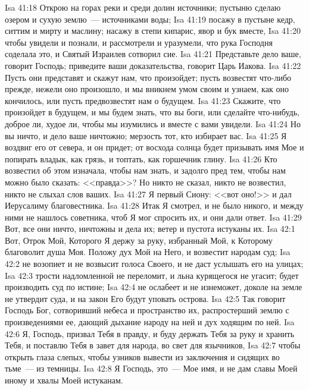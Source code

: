 \vs Isa 41:18 Открою на горах реки и среди долин источники; пустыню сделаю озером и сухую землю~--- источниками воды;
\vs Isa 41:19 посажу в пустыне кедр, ситтим и мирту и маслину; насажу в степи кипарис, явор и бук вместе,
\vs Isa 41:20 чтобы увидели и познали, и рассмотрели и уразумели, что рука Господня соделала это, и Святый Израилев сотворил сие.
\rsbpar\vs Isa 41:21 Представьте дело ваше, говорит Господь; приведите ваши доказательства, говорит Царь Иакова.
\vs Isa 41:22 Пусть они представят и скажут нам, что произойдет; пусть возвестят что-либо прежде, нежели оно произошло, и мы вникнем умом своим и узнаем, как оно кончилось, или пусть предвозвестят нам о будущем.
\vs Isa 41:23 Скажите, что произойдет в будущем, и мы будем знать, что вы боги, или сделайте что-нибудь, доброе ли, худое ли, чтобы мы изумились и вместе с вами увидели.
\vs Isa 41:24 Но вы ничто, и дело ваше ничтожно; мерзость тот, кто избирает вас.
\vs Isa 41:25 Я воздвиг его от севера, и он придет; от восхода солнца будет призывать имя Мое и попирать владык, как грязь, и топтать, как горшечник глину.
\vs Isa 41:26 Кто возвестил об этом изначала, чтобы нам знать, и задолго пред тем, чтобы нам можно было сказать: <<правда>>? Но никто не сказал, никто не возвестил, никто не слыхал слов ваших.
\vs Isa 41:27 Я первый  Сиону: <<вот оно!>> и дал Иерусалиму благовестника.
\vs Isa 41:28 Итак Я смотрел, и не было никого, и между ними не нашлось советника, чтоб Я мог спросить их, и они дали ответ.
\vs Isa 41:29 Вот, все они ничто, ничтожны и дела их; ветер и пустота истуканы их.
\vs Isa 42:1 Вот, Отрок Мой, Которого Я держу за руку, избранный Мой, к Которому благоволит душа Моя. Положу дух Мой на Него, и возвестит народам суд;
\vs Isa 42:2 не возопиет и не возвысит голоса Своего, и не даст услышать его на улицах;
\vs Isa 42:3 трости надломленной не переломит, и льна курящегося не угасит; будет производить суд по истине;
\vs Isa 42:4 не ослабеет и не изнеможет, доколе на земле не утвердит суда, и на закон Его будут уповать острова.
\rsbpar\vs Isa 42:5 Так говорит Господь Бог, сотворивший небеса и пространство их, распростерший землю с произведениями ее, дающий дыхание народу на ней и дух ходящим по ней.
\vs Isa 42:6 Я, Господь, призвал Тебя в правду, и буду держать Тебя за руку и хранить Тебя, и поставлю Тебя в завет для народа, во свет для язычников,
\vs Isa 42:7 чтобы открыть глаза слепых, чтобы узников вывести из заключения и сидящих во тьме~--- из темницы.
\vs Isa 42:8 Я Господь, это~--- Мое имя, и не дам славы Моей иному и хвалы Моей истуканам.
